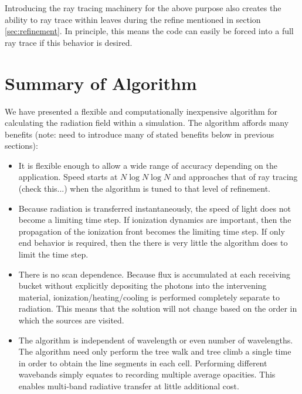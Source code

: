 Introducing the ray tracing machinery for the above purpose also creates the ability to ray trace within leaves during the refine mentioned in section \ref{sec:refinement}. In principle, this means the code can easily be forced into a full ray trace if this behavior is desired.

\section{Summary of Algorithm}
\label{sec:algorithmsummary}

We have presented a flexible and computationally inexpensive algorithm for calculating the radiation field within a simulation. The algorithm affords many benefits (note: need to introduce many of stated benefits below in previous sections):

\begin{itemize}
\item It is flexible enough to allow a wide range of accuracy depending on the application. Speed starts at  $N\log{N}\log{N}$ and approaches that of ray tracing (check this...) when the algorithm is tuned to that level of refinement.
\item Because radiation is transferred instantaneously, the speed of light does not become a limiting time step. If ionization dynamics are important, then the propagation of the ionization front becomes the limiting time step. If only end behavior is required, then the there is very little the algorithm does to limit the time step.
\item There is no scan dependence. Because flux is accumulated at each receiving bucket without explicitly depositing the photons into the intervening material, ionization/heating/cooling is performed completely separate to radiation. This means that the solution will not change based on the order in which the sources are visited.
\item The algorithm is independent of wavelength or even number of wavelengths. The algorithm need only perform the tree walk and tree climb a single time in order to obtain the line segments in each cell. Performing different wavebands simply equates to recording multiple average opacities. This enables multi-band radiative transfer at little additional cost.
\end{itemize}

